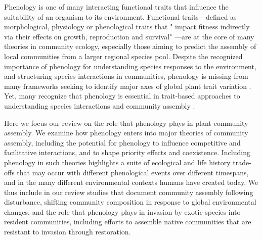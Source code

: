 \documentclass[11pt]{article}
\begin{document}
Phenology is one of many interacting functional traits that influence the suitability of an organism to its environment. Functional traits---defined as morphological, physiology or phenological traits that " impact fitness indirectly via their effects on growth, reproduction and survival" \citep{violle2007let}---are at the core of many theories in community ecology, especially those aiming to predict the assembly of local communities from a larger regional species pool. Despite the recognized importance of phenology for understanding species responses to the environment, and structuring species interactions in communities, phenology is missing from many frameworks seeking to identify major axes of global plant trait variation \citep[e.g.][]{westoby1998leaf,wright2004worldwide,diaz2016global,joswig2022climatic}. Yet, many recognize that phenology is essential in trait-based approaches to understanding species interactions and community assembly \citep{cope2022role}.

Here we focus our review on the role that phenology plays in plant community assembly. We examine how phenology enters into major theories of community assembly, including the potential for phenology to influence competitive and facilitative interactions, and to shape priority effects and coexistence. Including phenology in such theories highlights a suite of ecological and life history trade-offs that may occur with different phenological events over different timespans, and in the many different environmental contexts humans have created today. We thus include in our review studies that document community assembly following disturbance, shifting community composition in response to global environmental changes, and the role that phenology plays in invasion by exotic species into resident communities, including efforts to assemble native communities that are resistant to invasion through restoration. 
\end{document}
